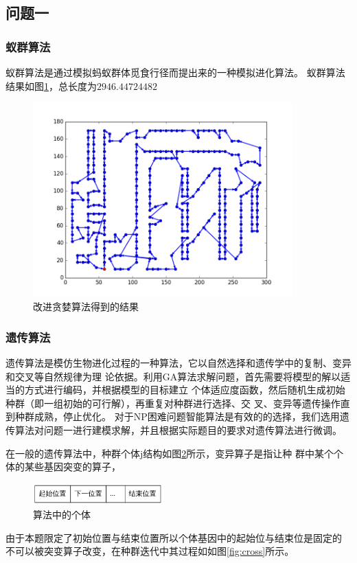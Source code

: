 \documentclass[fontset=windows,a4paper,12pt]{ctexart}
\begin{document}
    \subsection{问题一}
	   \subsubsection{蚁群算法}
		   蚁群算法是通过模拟蚂蚁群体觅食行径而提出来的一种模拟进化算法\cite{士勇2004蚁群算法及其应用}。
	       蚁群算法结果如图\ref{fig:anti}，总长度为$2946.44724482$
    	   \begin{figure}[htbp]
    	   	 \centering
    	   	 \includegraphics[width=10cm]{pic/anti_result.png}
    	   	 \caption{改进贪婪算法得到的结果}
    	   	 \label{fig:anti}
    	   \end{figure}
    	 
      \subsubsection{遗传算法}
      
      遗传算法是模仿生物进化过程的一种算法，它以自然选择和遗传学中的复制、变异和交叉等自然规律为理
      论依据。利用GA算法求解问题，首先需要将模型的解以适当的方式进行编码，并根据模型的目标建立
      个体适应度函数，然后随机生成初始种群（即一组初始的可行解），再重复对种群进行选择、交
      叉、变异等遗传操作直到种群成熟，停止优化\cite{赵静2008数学建模与数学实验}。
      对于NP困难问题智能算法是有效的的选择，我们选用遗传算法对问题一进行建模求解，并且根据实际题目的要求对遗传算法进行微调。
        
      在一般的遗传算法中，种群个体j结构如图\ref{fig:life}所示，变异算子是指让种
      群中某个个体的某些基因突变的算子，
		\begin{figure}[htbp]
			\centering
			\includegraphics[width=5cm]{pic/life_struct.png}
			\caption{算法中的个体}
			\label{fig:life}
		\end{figure}
        由于本题限定了初始位置与结束位置所以个体基因中的起始位与结束位是固定的
        不可以被突变算子改变，在种群迭代中其过程如如图\ref{fig:cross}所示。
		
\end{document}
